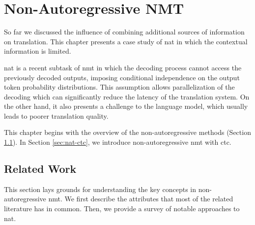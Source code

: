 \chapter{Non-Autoregressive NMT}
\label{chap:nat}

So far we discussed the influence of combining additional sources of information
on translation. This chapter presents a case study of \gls{nat} in which the
contextual information is limited.

\gls{nat} is a recent subtask of \gls{nmt} in which the decoding process cannot
access the previously decoded outputs, imposing conditional independence on the
output token probability distributions. This assumption allows parallelization
of the decoding which can significantly reduce the latency of the translation
system. On the other hand, it also presents a challenge to the language model,
which usually leads to poorer translation quality.

This chapter begins with the overview of the non-autoregressive methods (Section
\ref{sec:nat-methods}). In Section \ref{sec:nat-ctc}, we introduce
non-autoregressive \gls{nmt} with \gls{ctc}. 


\section{Related Work}
\label{sec:nat-methods}

This section lays grounds for understanding the key concepts in
non-autoregressive \gls{nmt}. We first describe the attributes that most of the
related literature has in common. Then, we provide a survey of notable
approaches to \gls{nat}.

